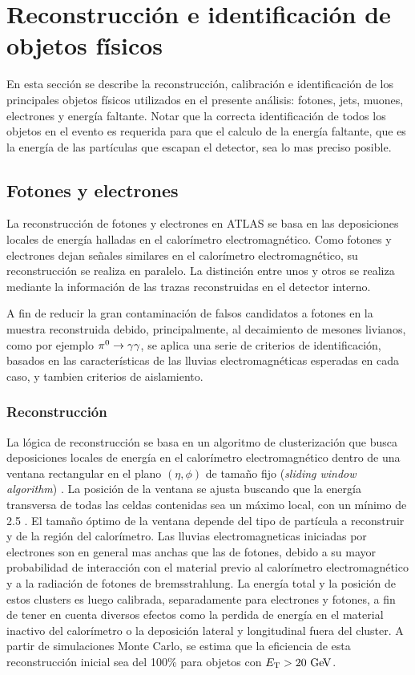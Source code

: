 \chapter{Reconstrucción e identificación de objetos físicos}
\label{sec:obj_selection}

En esta sección se describe la reconstrucción, calibración e identificación de
los principales objetos físicos utilizados en el presente análisis: fotones,
jets, muones, electrones y energía faltante. Notar que la correcta
identificación de todos los objetos en el evento es requerida para que el calculo de la
energía faltante, que es la energía de las partículas que escapan el detector,
sea lo mas preciso posible.



\section{Fotones y electrones}
\label{sec:obj_photons}

La reconstrucción de fotones y electrones en ATLAS se basa en las deposiciones
locales de energía halladas en el calorímetro electromagnético. Como fotones y
electrones dejan señales similares en el calorímetro electromagnético, su
reconstrucción se realiza en paralelo. La distinción entre unos y otros se
realiza mediante la información de las trazas reconstruidas en el detector
interno.

A fin de reducir la gran contaminación de falsos candidatos a fotones en la
muestra reconstruida debido, principalmente, al decaimiento de mesones livianos,
como por ejemplo $\pi^0 \to \gam\gam$, se aplica una serie de criterios de
identificación, basados en las características de las lluvias electromagnéticas
esperadas en cada caso, y tambien criterios de aislamiento.


\subsection{Reconstrucción}

La lógica de reconstrucción se basa en un algoritmo de clusterización que busca
deposiciones locales de energía en el calorímetro electromagnético dentro de una
ventana rectangular en el plano $(\eta, \phi)$ de tamaño fijo (\emph{sliding
  window algorithm}) . La posición de la ventana se
ajusta buscando que la energía transversa de todas las celdas contenidas sea un
máximo local, con un mínimo de 2.5 \gev. El tamaño óptimo de la ventana depende
del tipo de partícula a reconstruir y de la región del calorímetro. Las lluvias
electromagneticas iniciadas por electrones son en general mas anchas que las de
fotones, debido a su mayor probabilidad de interacción con el material previo al
calorímetro electromagnético y a la radiación de fotones de bremsstrahlung. La
energía total y la posición de estos clusters es luego calibrada, separadamente
para electrones y fotones, a fin de tener en cuenta diversos efectos como la
perdida de energía en el material inactivo del calorímetro o la deposición
lateral y longitudinal fuera del cluster. A partir de simulaciones Monte Carlo,
se estima que la eficiencia de esta reconstrucción inicial sea del 100\% para
objetos con $\et > 20 \gev$.


